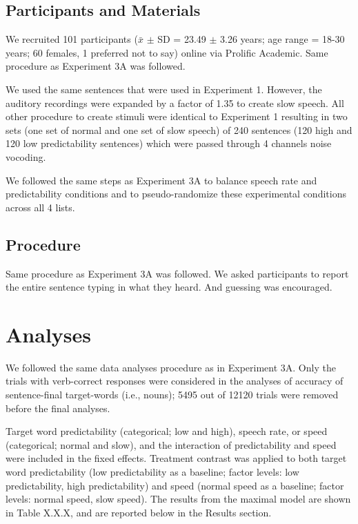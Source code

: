 \documentclass[a4paper, nobind]{templates/ociamthesis}
\begin{document}
\hypertarget{participants-and-materials-1}{%
\subsection{Participants and Materials}\label{participants-and-materials-1}}

We recruited 101 participants (\(\bar{x}\) \(\pm\) SD = 23.49 \(\pm\) 3.26 years; age range = 18-30 years; 60 females, 1 preferred not to say) online via Prolific Academic.
Same procedure as Experiment 3A was followed.

We used the same sentences that were used in Experiment 1. However, the auditory recordings were expanded by a factor of 1.35 to create slow speech. All other procedure to create stimuli were identical to Experiment 1 resulting in two sets (one set of normal and one set of slow speech) of 240 sentences (120 high and 120 low predictability sentences) which were passed through 4 channels noise vocoding.

We followed the same steps as Experiment 3A to balance speech rate and predictability conditions and to pseudo-randomize these experimental conditions across all 4 lists.

\hypertarget{procedure-4}{%
\subsection{Procedure}\label{procedure-4}}

Same procedure as Experiment 3A was followed.
We asked participants to report the entire sentence typing in what they heard.
And guessing was encouraged.

\hypertarget{analyses-4}{%
\section{Analyses}\label{analyses-4}}

We followed the same data analyses procedure as in Experiment 3A.
Only the trials with verb-correct responses were considered in the analyses of accuracy of sentence-final target-words (i.e., nouns); 5495 out of 12120 trials were removed before the final analyses.

Target word predictability (categorical; low and high), speech rate, or speed (categorical; normal and slow), and the interaction of predictability and speed were included in the fixed effects.
Treatment contrast was applied to both target word predictability (low predictability as a baseline; factor levels: low predictability, high predictability) and speed (normal speed as a baseline; factor levels: normal speed, slow speed).
The results from the maximal model are shown in Table X.X.X, and are reported below in the Results section.
\end{document}
